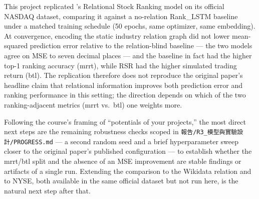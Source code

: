 \documentclass[11pt]{article}
\begin{document}
This project replicated \citet{feng2019temporal}'s Relational Stock Ranking model on its official
NASDAQ dataset, comparing it against a no-relation Rank\_LSTM baseline under a matched training
schedule (50 epochs, same optimizer, same embedding). At convergence, encoding the static industry
relation graph did not lower mean-squared prediction error relative to the relation-blind baseline
--- the two models agree on MSE to seven decimal places --- and the baseline in fact had the higher
top-1 ranking accuracy (mrrt), while RSR had the higher simulated trading return (btl). The
replication therefore does not reproduce the original paper's headline claim that relational
information improves both prediction error and ranking performance in this setting; the direction
depends on which of the two ranking-adjacent metrics (mrrt vs.\ btl) one weights more.

Following the course's framing of ``potentials of your projects,'' the most direct next steps are
the remaining robustness checks scoped in \texttt{報告/R3\_模型與實驗設計/PROGRESS.md} --- a second
random seed and a brief hyperparameter sweep closer to the original paper's published
configuration --- to establish whether the mrrt/btl split and the absence of an MSE improvement
are stable findings or artifacts of a single run. Extending the comparison to the Wikidata relation
and to NYSE, both available in the same official dataset but not run here, is the natural next
step after that.



\end{document}
